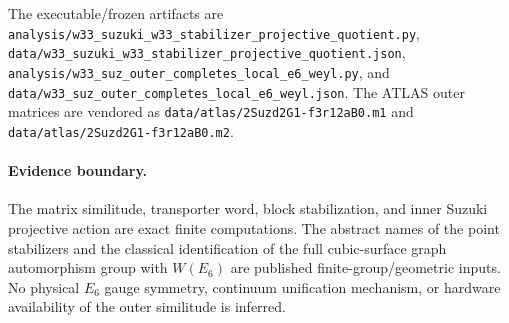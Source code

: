 The executable/frozen artifacts are
\texttt{analysis/w33\_suzuki\_w33\_stabilizer\_projective\_quotient.py},
\texttt{data/w33\_suzuki\_w33\_stabilizer\_projective\_quotient.json},
\texttt{analysis/w33\_suz\_outer\_completes\_local\_e6\_weyl.py}, and
\texttt{data/w33\_suz\_outer\_completes\_local\_e6\_weyl.json}.  The ATLAS
outer matrices are vendored as
\texttt{data/atlas/2Suzd2G1-f3r12aB0.m1} and
\texttt{data/atlas/2Suzd2G1-f3r12aB0.m2}.

\paragraph{Evidence boundary.}
The matrix similitude, transporter word, block stabilization, and inner Suzuki
projective action are exact finite computations.  The abstract names of the
point stabilizers and the classical identification of the full cubic-surface
graph automorphism group with $W(E_6)$ are published finite-group/geometric
inputs.  No physical $E_6$ gauge symmetry, continuum unification mechanism, or
hardware availability of the outer similitude is inferred.
